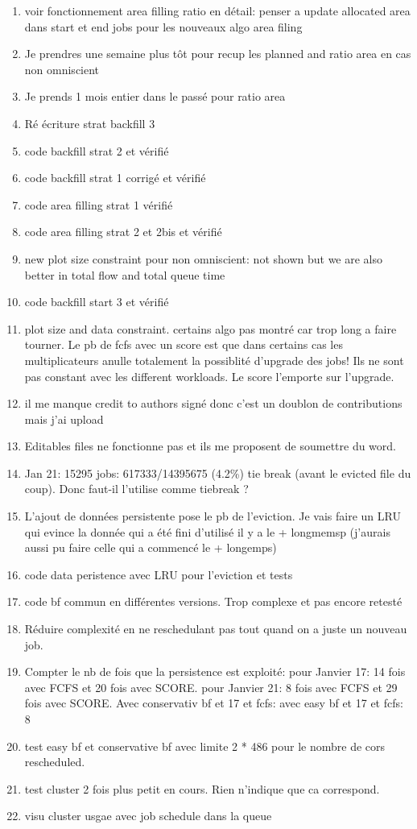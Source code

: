 \documentclass[a4paper]{article}
\begin{document}
\begin{enumerate}
		\item voir fonctionnement area filling ratio en détail: penser a update allocated area dans start et end jobs pour les nouveaux algo area filing
		\item Je prendres une semaine plus tôt pour recup les planned and ratio area en cas non omniscient
		\item Je prends 1 mois entier dans le passé pour ratio area
		\item Ré écriture strat backfill 3
		\item code backfill strat 2 et vérifié
		\item code backfill strat 1 corrigé et vérifié
		\item code area filling strat 1 vérifié
		\item code area filling strat 2 et 2bis et vérifié
		\item new plot size constraint pour non omniscient: not shown but we are also better in total flow and total queue time
		\item code backfill start 3 et vérifié
		\item plot size and data constraint. certains algo pas montré car trop long a faire tourner. Le pb de fcfs avec un score est que dans certains cas les multiplicateurs anulle totalement la possiblité d'upgrade des jobs! Ils ne sont pas constant avec les different workloads. Le score l'emporte sur l'upgrade.
		
		\item il me manque credit to authors signé donc c'est un doublon de contributions mais j'ai upload
		\item Editables files ne fonctionne pas et ils me proposent de soumettre du word.

		\item Jan 21: 15295 jobs: 617333/14395675 (4.2\%) tie break (avant le evicted file du coup). Donc faut-il l'utilise comme tiebreak ?
		\item L'ajout de données persistente pose le pb de l'eviction. Je vais faire un LRU qui evince la donnée qui a été fini d'utilisé il y a le + longmemsp (j'aurais aussi pu faire celle qui a commencé le + longemps)
		\item code data peristence avec LRU pour l'eviction et tests
		\item code bf commun en différentes versions. Trop complexe et pas encore retesté
		\item Réduire complexité en ne reschedulant pas tout quand on a juste un nouveau job.
		\item Compter le nb de fois que la persistence est exploité: pour Janvier 17: 14 fois avec FCFS et 20 fois avec SCORE. pour Janvier 21: 8 fois avec FCFS et 29 fois avec SCORE. Avec conservativ bf et 17 et fcfs: avec easy bf et 17 et fcfs: 8
		\item test easy bf et conservative bf avec limite  2 * 486 pour le nombre de cors rescheduled.
		\item test cluster 2 fois plus petit en cours. Rien n'indique que ca correspond.
		\item visu cluster usgae avec job schedule dans la queue
		

\end{enumerate}
\end{document}
